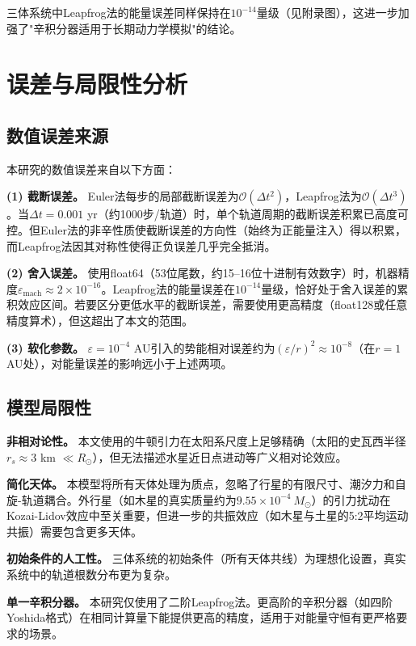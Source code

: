 \documentclass[twocolumn,10pt]{article}
\begin{document}
三体系统中Leapfrog法的能量误差同样保持在$10^{-14}$量级（见附录图），这进一步加强了"辛积分器适用于长期动力学模拟"的结论。

\section{误差与局限性分析}

\subsection{数值误差来源}

本研究的数值误差来自以下方面：

\textbf{(1) 截断误差。} Euler法每步的局部截断误差为$\mathcal{O}(\Delta t^2)$，Leapfrog法为$\mathcal{O}(\Delta t^3)$。当$\Delta t = 0.001$ yr（约1000步/轨道）时，单个轨道周期的截断误差积累已高度可控。但Euler法的非辛性质使截断误差的方向性（始终为正能量注入）得以积累，而Leapfrog法因其对称性使得正负误差几乎完全抵消。

\textbf{(2) 舍入误差。} 使用float64（53位尾数，约15--16位十进制有效数字）时，机器精度$\varepsilon_{\text{mach}} \approx 2\times 10^{-16}$。Leapfrog法的能量误差在$10^{-14}$量级，恰好处于舍入误差的累积效应区间。若要区分更低水平的截断误差，需要使用更高精度（float128或任意精度算术），但这超出了本文的范围。

\textbf{(3) 软化参数。} $\varepsilon = 10^{-4}$ AU引入的势能相对误差约为$(\varepsilon/r)^2 \approx 10^{-8}$（在$r = 1$ AU处），对能量误差的影响远小于上述两项。

\subsection{模型局限性}

\textbf{非相对论性。} 本文使用的牛顿引力在太阳系尺度上足够精确（太阳的史瓦西半径$r_s \approx 3$ km $\ll R_\odot$），但无法描述水星近日点进动等广义相对论效应。

\textbf{简化天体。} 本模型将所有天体处理为质点，忽略了行星的有限尺寸、潮汐力和自旋-轨道耦合。外行星（如木星的真实质量约为$9.55\times 10^{-4}\ M_\odot$）的引力扰动在Kozai-Lidov效应中至关重要，但进一步的共振效应（如木星与土星的5:2平均运动共振）需要包含更多天体。

\textbf{初始条件的人工性。} 三体系统的初始条件（所有天体共线）为理想化设置，真实系统中的轨道根数分布更为复杂。

\textbf{单一辛积分器。} 本研究仅使用了二阶Leapfrog法。更高阶的辛积分器（如四阶Yoshida格式\cite{yoshida1990construction}）在相同计算量下能提供更高的精度，适用于对能量守恒有更严格要求的场景。
\end{document}

